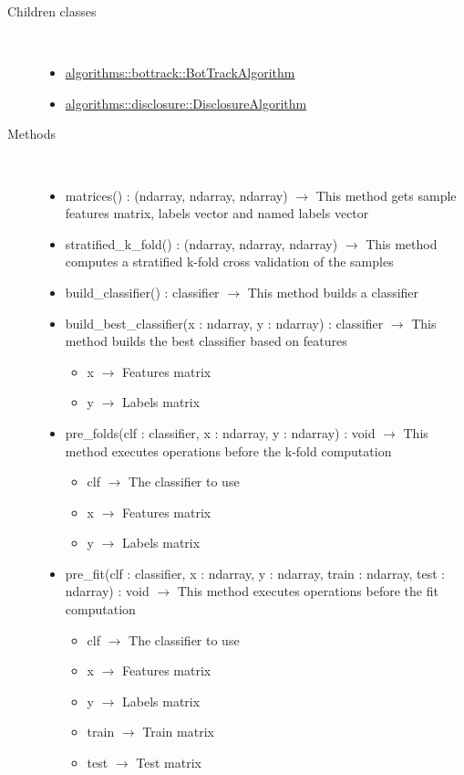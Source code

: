 \begin{description}
\item[Children classes] \hfill \\
 \vspace{-1cm}
\begin{itemize}
\item \hyperlink{algorithms::bottrack::BotTrackAlgorithm}{algorithms::bottrack::BotTrackAlgorithm}
\item \hyperlink{algorithms::disclosure::DisclosureAlgorithm}{algorithms::disclosure::DisclosureAlgorithm}
\end{itemize}

\item[Methods] \hfill \\
 \vspace{-1cm}
\begin{itemize}
\item matrices() : (ndarray, ndarray, ndarray) $\rightarrow$ This method gets sample features matrix, labels vector and named labels vector
\item stratified\_k\_fold() : (ndarray, ndarray, ndarray) $\rightarrow$ This method computes a stratified k-fold cross validation of the samples
\item build\_classifier() : classifier $\rightarrow$ This method builds a classifier
\item build\_best\_classifier(x : ndarray, y : ndarray) : classifier $\rightarrow$ This method builds the best classifier based on features\begin{itemize}
\item x $\rightarrow$ Features matrix
\item y $\rightarrow$ Labels matrix
\end{itemize}

\item pre\_folds(clf : classifier, x : ndarray, y : ndarray) : void $\rightarrow$ This method executes operations before the k-fold computation\begin{itemize}
\item clf $\rightarrow$ The classifier to use
\item x $\rightarrow$ Features matrix
\item y $\rightarrow$ Labels matrix
\end{itemize}

\item pre\_fit(clf : classifier, x : ndarray, y : ndarray, train : ndarray, test : ndarray) : void $\rightarrow$ This method executes operations before the fit computation\begin{itemize}
\item clf $\rightarrow$ The classifier to use
\item x $\rightarrow$ Features matrix
\item y $\rightarrow$ Labels matrix
\item train $\rightarrow$ Train matrix
\item test $\rightarrow$ Test matrix
\end{itemize}


\end{itemize}
\end{description}

